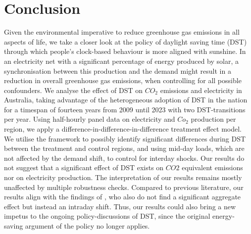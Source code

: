 \section{Conclusion}
Given the environmental imperative to reduce greenhouse gas emissions in all aspects of life, we take a closer look at the policy of daylight saving time (\ac{DST}) through which people's clock-based behaviour is more aligned with sunshine. In an electricity net with a significant percentage of energy produced by solar, a synchronisation between this production and the demand might result in a reduction in overall greenhouse gas emissions, when controlling for all possible confounders. 
We analyse the effect of DST on $CO_2$ emissions and electricity in Australia, taking advantage of the heterogeneous adoption of DST in the nation for a timespan of fourteen years from 2009 until 2023 with two \ac{DST}-transitions per year. Using half-hourly panel data on electricity and $Co_2$ production per region, we apply a difference-in-difference-in-difference treatment effect model. We utilise the framework to possibly identify significant differences during \ac{DST} between the treatment and control regions, and using mid-day loads, which are not affected by the demand shift, to control for interday shocks. Our results do not suggest that a significant effect of DST exists on $CO2$ equivalent emissions nor on electricity production. The interpretation of our results remains mostly unaffected by multiple robustness checks. Compared to previous literature, our results align with the findings of \textcites{kellogg_daylight_2008}, who also do not find a significant aggregate effect but instead an intraday shift. 
Thus, our results could also bring a new impetus to the ongoing policy-discussions of \ac{DST}, since the original energy-saving argument of the policy no longer applies. 